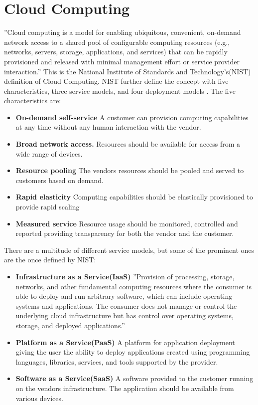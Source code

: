 \documentclass[]{uiophd}
\begin{document}
\section{Cloud Computing}
''Cloud computing is a model for enabling ubiquitous, convenient, on-demand network access to a shared pool of configurable computing resources (e.g., networks, servers, storage, applications, and services) that can be rapidly provisioned and released with minimal management effort or service provider interaction.''\cite{Mell:2011:SND:2206223} This is the National Institute of Standards and Technology's(NIST) definition of Cloud Computing. NIST further define the concept with five characteristics, three service models, and four deployment models \cite{Mell:2011:SND:2206223}. The five characteristics are:
\begin{itemize}
\item \textbf{On-demand self-service} A customer can provision computing capabilities at any time without any human interaction with the vendor.
\item \textbf{Broad network access.} Resources should be available for access from a wide range of devices.
\item \textbf{Resource pooling} The vendors resources should be pooled and served to customers based on demand.
\item \textbf{Rapid elasticity} Computing capabilities should be elastically provisioned to provide rapid scaling 
\item \textbf{Measured service} Resource usage should be monitored, controlled and reported providing transparency for both the vendor and the customer.
\end{itemize}

There are a multitude of different service models, but some of the prominent ones are the once defined by NIST:
\begin{itemize}
\item \textbf{Infrastructure as a Service(IaaS)} ''Provision of processing, storage, networks, and other fundamental computing resources where the consumer is able to deploy and run arbitrary software, which can include operating systems and applications. The consumer does not manage or control the underlying cloud infrastructure but has control over operating systems, storage, and deployed applications.''\cite{Mell:2011:SND:2206223}
\item \textbf{Platform as a Service(PaaS)} A platform for application deployment giving the user the ability to deploy applications created using programming languages, libraries, services, and tools supported by the provider.
\item \textbf{Software as a Service(SaaS)} A software provided to the customer running on the vendors infrastructure. The application should be available from various devices.
\end{itemize}
\end{document}
